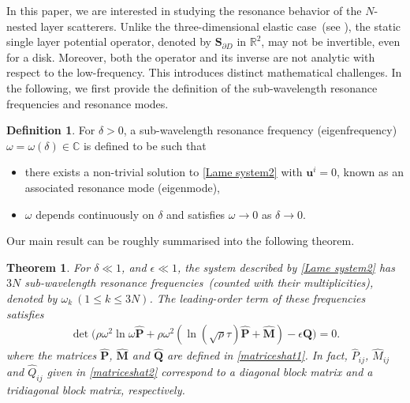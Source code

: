 \documentclass[10pt,reqno,oneside]{amsart}%
\newtheorem{thm}{Theorem}[section]
\theoremstyle{definition}
\newtheorem{defn}{Definition}[section]
\theoremstyle{remark}
\numberwithin{equation}{section}
\numberwithin{equation}{section}
\begin{document}
In this paper, we are interested in studying the resonance behavior of the $N$-nested layer scatterers. Unlike the three-dimensional elastic case~(see \cite{Minnaertresonances,HLi2024}), the static single layer potential operator, denoted by $\mathbf{S}_{\partial D}$ in $\mathbb{R}^{2}$, may not be invertible, even for a disk. Moreover, both the operator and its inverse are not analytic with respect to the low-frequency. This introduces distinct mathematical challenges. In the following, we first provide the definition of the sub-wavelength resonance frequencies and resonance modes.
\begin{defn}
For $\delta > 0$, a sub-wavelength resonance frequency (eigenfrequency) $\omega=\omega(\delta)\in \mathbb{C}$ is defined to be such that
\begin{itemize}
\item[(i)] there exists a non-trivial solution to \eqref{Lame system2} with $\mathbf{u}^{i} = 0$, known as an associated resonance mode (eigenmode),
\item[(ii)] $\omega$ depends continuously on $\delta$ and satisfies $\omega \to 0$ as $\delta \to 0$.
\end{itemize}
\end{defn}
Our main result can be roughly summarised into the following theorem.
\begin{thm}\label{multifrequencies}
For $\delta\ll 1$, and $\epsilon \ll 1$, the system described by \eqref{Lame system2} has $3N$
sub-wavelength resonance frequencies~(counted with their multiplicities), denoted by $\omega_k~(1\leq k\leq3N)$. The leading-order term of these frequencies satisfies
\begin{align}\label{multiformula}
\det\Big(\rho\omega^2\ln\omega\hat{\mathbf{P}}+\rho\omega^2\left(\ln{(\sqrt{\rho}\tau)}\hat{\mathbf{P}}
+\hat{\mathbf{M}}\right)-\epsilon\hat{\mathbf{Q}}\Big)=0.
\end{align}
where the matrices $\hat{\mathbf{P}}$, $\hat{\mathbf{M}}$ and $\hat{\mathbf{Q}}$ are defined in \eqref{matriceshat1}. In fact, $\hat{P}_{ij}$, $\hat{M}_{ij}$ and $\hat{Q}_{ij}$ given in \eqref{matriceshat2} correspond to a diagonal block matrix and a tridiagonal block matrix, respectively.
\end{thm}
\end{document}
